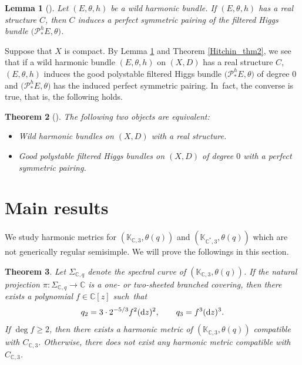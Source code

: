 \documentclass[10pt,a4paper]{amsart}
\numberwithin{equation}{section}
\newtheorem{Theorem}{Theorem}[section]
\newtheorem{Lemma}[Theorem]{Lemma}
\newcommand{\C}{\mathbb{C}}
\begin{document}
\begin{Lemma}[{\cite[Lemma 3.16]{LM1}}]\label{lemma_real_str}
 Let $(E,\theta,h)$ be a wild harmonic bundle. If $(E,\theta,h)$ has a real structure $C$, then $C$ induces a perfect symmetric pairing of the filtered Higgs bundle $\bigl(\mathcal{P}_{*}^{h} E,\theta\bigr)$.
\end{Lemma}
Suppose that $X$ is compact. By Lemma \ref{lemma_real_str} and Theorem \ref{Hitchin_thm2}, we see that if a wild harmonic bundle $(E,\theta,h)$ on $(X,D)$ has a real structure $C$, $(E,\theta,h)$ induces the good polystable filtered Higgs bundle $\bigl(\mathcal{P}_{*}^{h} E,\theta\bigr)$ of degree $0$ and $\bigl(\mathcal{P}_{*}^{h} E,\theta\bigr)$ has the induced perfect symmetric pairing. In~fact, the converse is true, that is, the following holds.
\begin{Theorem}[{\cite[Theorem 3.28]{LM1}}]\label{correspond_thm}
 The following two objects are equivalent:
 \begin{itemize}\itemsep=0pt
 \item Wild harmonic bundles on $(X,D)$ with a real structure.
 \item Good polystable filtered Higgs bundles on $(X,D)$ of degree $0$ with a perfect symmetric pairing.
 \end{itemize}
\end{Theorem}

\section{Main results}
We study harmonic metrics for $(\mathbb{K}_{\C,3},\theta(q))$ and $(\mathbb{K}_{\C^*,3},\theta(q))$ which are not generically regular semisimple. We will prove the followings in this section.

\begin{Theorem}\label{main'}
 Let $\Sigma_{\C,q}$ denote the spectral curve of $(\mathbb{K}_{\C,3},\theta(q))$. If the natural projection $\pi\colon \Sigma_{\C,q}\to \C$ is a one- or two-sheeted branched covering, then there exists a polynomial $f\in \C[z]$ such~that
 \begin{equation*}
 q_2 = 3\cdot 2^{-5/3}f^2 ({\rm d}z)^2, \qquad q_3 = f^3 ({\rm d}z)^3.
 \end{equation*}
 If $\deg{f}\geq 2$, then there exists a harmonic metric of $(\mathbb{K}_{\C,3},\theta(q))$ compatible with $C_{\C,3}$. Otherwise, there does not exist any harmonic metric compatible with $C_{\C,3}$.
\end{Theorem}
\end{document}
